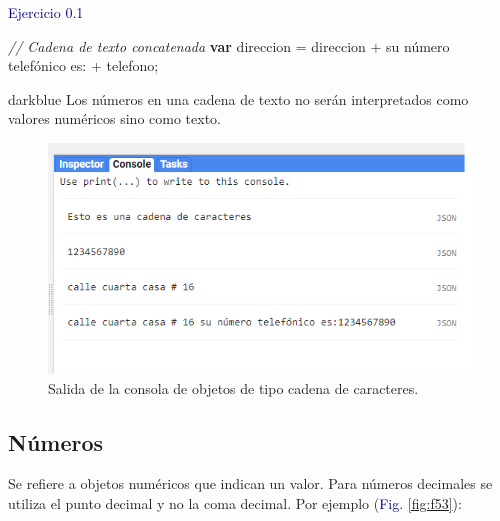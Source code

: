 \documentclass[
  12pt,
  letterpaper,
  twoside]{book}
\newenvironment{Shaded}{\begin{snugshade}}{\end{snugshade}}
\newcommand{\CommentTok}[1]{\textcolor[rgb]{0.24,0.58,0.00}{\textit{#1}}}
\newcommand{\ControlFlowTok}[1]{\textcolor[rgb]{0.00,0.00,0.00}{\textbf{#1}}}
\newcommand{\NormalTok}[1]{#1}
\newcommand{\OperatorTok}[1]{\textcolor[rgb]{0.00,0.00,0.00}{#1}}
\newcommand{\StringTok}[1]{\textcolor[rgb]{0.87,0.29,0.22}{#1}}
\begin{document}
\newpage

\textcolor{darkblue}{Ejercicio 0.1}

\begin{Shaded}
\begin{Highlighting}[]
\CommentTok{// Cadena de texto concatenada}
\ControlFlowTok{var}\NormalTok{ direccion }\OperatorTok{=}\NormalTok{ direccion }\OperatorTok{+} \StringTok{\textquotesingle{} su número telefónico es:\textquotesingle{}} \OperatorTok{+}\NormalTok{ telefono}\OperatorTok{;}
\end{Highlighting}
\end{Shaded}

\begin{bluebox2}

\begin{awesomeblock}{5pt}{\faLightbulb}{darkblue}
Los números en una cadena de texto no serán interpretados como valores numéricos sino como texto.

\end{awesomeblock}

\end{bluebox2}

\begin{figure}[H]

{\centering \includegraphics[width=0.8\linewidth]{Img/ej0} 

}

\caption{Salida de la consola de objetos de tipo cadena de caracteres.}\label{fig:f52}
\end{figure}

\hypertarget{nuxfameros}{%
\subsection*{Números}\label{nuxfameros}}

Se refiere a objetos numéricos que indican un valor. Para números decimales se utiliza el punto decimal y no la coma decimal. Por ejemplo (\textcolor{darkblue}{Fig.} \ref{fig:f53}):
\end{document}
